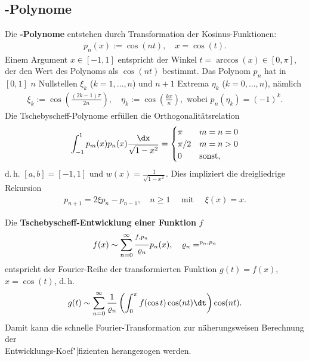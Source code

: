 \pagebreak

\subsection{%
    -Polynome%
}

Die \textbf{-Polynome} entstehen durch Transformation
der Kosinus-Funktionen:
\begin{align*}
    p_n(x) := \cos(nt), \quad
    x = \cos(t).
\end{align*}
Einem Argument $x \in [-1, 1]$ entspricht der Winkel
$t = \arccos(x) \in [0,\pi]$, der den Wert des Polynoms als $\cos(nt)$
bestimmt.
Das Polynom $p_n$ hat in $[0,1]$ $n$ Nullstellen $\xi_k$ ($k = 1, \dotsc, n$)
und $n + 1$ Extrema $\eta_k$ ($k = 0, \dotsc, n$), nämlich
\begin{align*}
    \xi_k := \cos\left(\frac{(2k - 1)\pi}{2n}\right), \quad
    \eta_k := \cos\left(\frac{k\pi}{n}\right), \text{ wobei }
    p_n(\eta_k) = (-1)^k.
\end{align*}
Die Tschebyscheff-Polynome erfüllen die Orthogonalitätsrelation
\begin{align*}
    \int_{-1}^1 p_m(x) p_n(x) \frac{\dx}{\sqrt{1 - x^2}} =
    \begin{cases}\pi & m = n = 0 \\ \pi/2 & m = n > 0 \\ 0 & \text{sonst},
    \end{cases}
\end{align*}
d.\,h. $[a,b] = [-1, 1]$ und $w(x) = \frac{1}{\sqrt{1 - x^2}}$.
Dies impliziert die dreigliedrige Rekursion
\begin{align*}
    p_{n+1} = 2 \xi p_n - p_{n-1}, \quad n \ge 1 \quad \text{ mit } \quad
    \xi(x) = x.
\end{align*}

\linie

Die \textbf{Tschebyscheff-Entwicklung einer Funktion} $f$
\begin{align*}
    f(x) \sim \sum_{n=0}^\infty \frac{\sp{f, p_n}}{\varrho_n} p_n(x),
    \quad \varrho_n = \sp{p_n, p_n}
\end{align*}
entspricht der Fourier-Reihe der transformierten Funktion $g(t) = f(x)$,
$x = \cos(t)$, d.\,h.
\begin{align*}
    g(t) \sim \sum_{n=0}^\infty \frac{1}{\varrho_n}
    \left(\int_0^\pi f(\cos t) \cos(nt) \dt\right) \cos(nt).
\end{align*}
Damit kann die schnelle Fourier-Transformation zur näherungsweisen Berechnung
der \\
Entwicklungs-Koef"|fizienten herangezogen werden.

